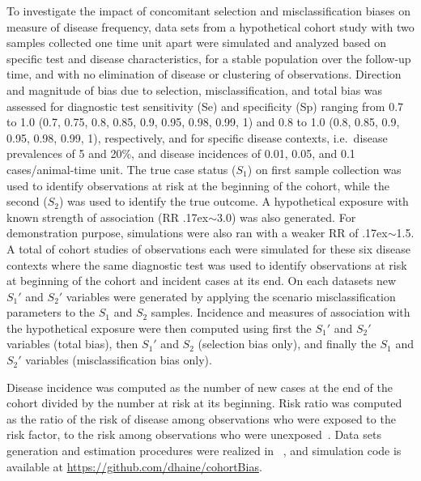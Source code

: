 To investigate the impact of concomitant selection and misclassification biases
on measure of disease frequency, data sets from a hypothetical cohort study with
two samples collected one time unit apart were simulated and analyzed based on
specific test and disease characteristics, for a stable population over the
follow-up time, and with no elimination of disease or clustering of
observations.
Direction and magnitude of bias due to selection, misclassification, and total
bias was assessed for diagnostic test sensitivity (Se) and specificity (Sp)
ranging from 0.7 to 1.0 (0.7, 0.75, 0.8, 0.85, 0.9, 0.95, 0.98, 0.99, 1) and 0.8
to 1.0 (0.8, 0.85, 0.9, 0.95, 0.98, 0.99, 1), respectively, and for specific
disease contexts, i.e.\ disease prevalences of 5 and 20\%, and disease
incidences of 0.01, 0.05, and 0.1 cases/animal-time unit.
The true case status (\(S_1\)) on first sample collection was used to identify
observations at risk at the beginning of the cohort, while the second (\(S_2\))
was used to identify the true outcome.
A hypothetical exposure with known strength of association (RR
\raise.17ex\hbox{$\scriptstyle\sim$}\num{3.0}) was also generated.
For demonstration purpose, simulations were also ran with a weaker RR of
\raise.17ex\hbox{$\scriptstyle\sim$}\num{1.5}.
A total of  cohort studies of  observations each
were simulated for these six disease contexts where the same diagnostic test was
used to identify observations at risk at beginning of the cohort and incident
cases at its end.
On each datasets new \(S_{1}'\) and \(S_{2}'\) variables were generated by
applying the scenario misclassification parameters to the \(S_1\) and \(S_2\)
samples.
Incidence and measures of association with the hypothetical exposure were then
computed using first the \(S_{1}'\) and \(S_{2}'\) variables (total bias), then
\(S_{1}'\) and \(S_2\) (selection bias only), and finally the \(S_1\) and
\(S_{2}'\) variables (misclassification bias only).

Disease incidence was computed as the number of new cases at the end of the
cohort divided by the number at risk at its beginning.
Risk ratio was computed as the  ratio of the risk of disease among observations
who were exposed to the risk factor, to the risk among observations who were
unexposed~\citep{Rothman2012}.
Data sets generation and estimation procedures were realized in
\R~\citep{Rsystem}, and simulation code is available at
\url{https://github.com/dhaine/cohortBias}.

